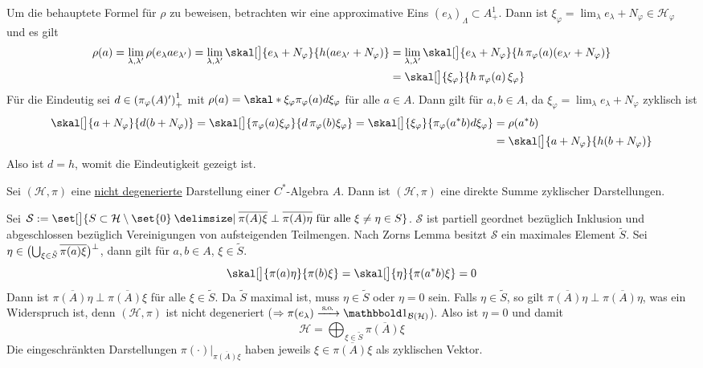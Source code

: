 \begin{beweis}
	Um die behauptete Formel für $\rho$ zu beweisen, betrachten wir eine approximative Eins $(e_\lambda)_\Lambda \subset A^1_+$. 
	Dann ist $\xi_\varphi = \lim_\lambda e_\lambda+ N_\varphi \in \mathcal{H}_\varphi$ und es gilt
	\begin{align}
		\rho(a)= \lim_{\lambda,\lambda'} \rho \enbrace*{e_\lambda a e_{\lambda'}}= \lim_{\lambda,\lambda'} \skal[\big]{e_\lambda + N_\varphi}{h(a e_{\lambda'}+ N_\varphi)}
		&= \lim_{\lambda,\lambda'} \skal[\big]{e_\lambda+ N_\varphi}{h\,\pi_\varphi(a) (e_{\lambda'} + N_\varphi)} \\
		&= \skal[\big]{\xi_\varphi}{h\, \pi_\varphi(a)\,\xi_\varphi}
	\end{align}
	Für die Eindeutig sei $d \in \enbrace*{\pi_\varphi(A)'}^1_+$ mit $\rho(a)= \skal*{\xi_\varphi}{\pi_\varphi(a)d \xi_\varphi}$ für alle $a \in A$.
	Dann gilt für $a,b \in A$, da $\xi_\varphi = \lim_\lambda e_\lambda+ N_\varphi$ zyklisch ist
	\begin{align}
		\skal[\big]{a+ N_\varphi}{d(b+N_\varphi)} = \skal[\big]{\pi_\varphi(a) \xi_\varphi}{d \,\pi_\varphi(b) \xi_\varphi} = \skal[\big]{\xi_\varphi}{\pi_\varphi(a^*b)d \xi_\varphi} 
		&= \rho(a^*b) \\ &= \skal[\big]{a+ N_\varphi}{h(b+N_\varphi)}
	\end{align}
	Also ist $d=h$, womit die Eindeutigkeit gezeigt ist.
\end{beweis}

\begin{satz}[{name=[Darstellung als direkte Summe]}]
	Sei $(\mathcal{H},\pi)$ eine \hyperref[def:510]{nicht degenerierte} Darstellung einer $C^*$-Algebra $A$.
	Dann ist $(\mathcal{H},\pi)$ eine direkte Summe zyklischer Darstellungen.
\end{satz}
\begin{beweis}
	Sei $\mathcal{S} := \set[\big]{S \subset \mathcal{H}\setminus \set{0} \given {\overline{\pi(A) \xi}} \perp {\overline{\pi(A)\eta}} \text{ für alle }\xi \neq \eta \in S }$.
	$\mathcal{S}$ ist partiell geordnet bezüglich Inklusion und abgeschlossen bezüglich Vereinigungen von aufsteigenden Teilmengen.
	Nach Zorns Lemma besitzt $\mathcal{S}$ ein maximales Element $\tilde{S}$.
	Sei $\eta \in \enbrace[\big]{\bigcup_{\xi \in \tilde{S}} \overline{\pi(a)\xi}}^{\raisemath{-1pt}{\bot}}$, dann gilt für $a,b \in A$, $\xi \in \tilde{S}$.
	\[
		\skal[\big]{\pi(a) \eta}{\pi(b)\xi} = \skal[\big]{\eta}{ \pi(a^*b)\xi} =0
	\]
	Dann ist $\overline{\pi(A)\eta} \perp \overline{\pi(A)\xi}$ für alle $\xi \in \tilde{S}$.
	Da $\tilde{S}$ maximal ist, muss $\eta \in \tilde{S}$ oder $\eta=0$ sein.
	Falls $\eta \in \tilde{S}$, so gilt $\overline{\pi(A)\eta}\perp \overline{\pi(A)\eta}$, was ein Widerspruch ist, denn $(\mathcal{H},\pi)$ ist nicht degeneriert ($\Rightarrow  \pi(e_\lambda)\grenzw{\so}\ind_{\mathcal{B}(\mathcal{H})}$).
	Also ist $\eta=0$ und damit
	\[
		\mathcal{H} = \bigoplus_{\xi \in \tilde{S}} \overline{\pi(A)\xi}
	\]
	Die eingeschränkten Darstellungen $\pi(\cdot )\big|_{\overline{\pi(A)\xi}}$ haben jeweils $\xi \in \overline{\pi(A)\xi}$ als zyklischen Vektor.
\end{beweis}

